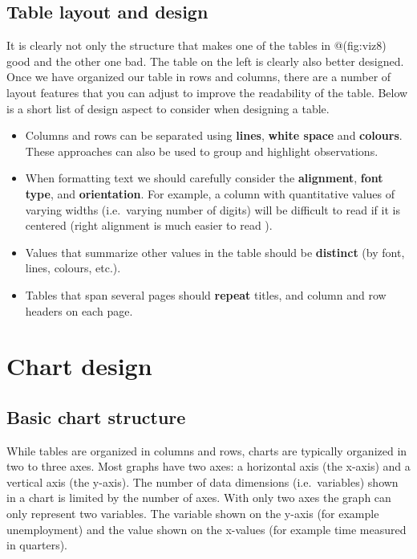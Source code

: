 \documentclass[
]{book}
\begin{document}
\hypertarget{table-layout-and-design}{%
\subsection*{Table layout and design}\label{table-layout-and-design}}

It is clearly not only the structure that makes one of the tables in @(fig:viz8) good and the other one bad. The table on the left is clearly also better designed. Once we have organized our table in rows and columns, there are a number of layout features that you can adjust to improve the readability of the table. Below is a short list of design aspect to consider when designing a table.

\begin{itemize}
\item
  Columns and rows can be separated using \textbf{lines}, \textbf{white space} and \textbf{colours}. These approaches can also be used to group and highlight observations.
\item
  When formatting text we should carefully consider the \textbf{alignment}, \textbf{font type}, and \textbf{orientation}. For example, a column with quantitative values of varying widths (i.e.~varying number of digits) will be difficult to read if it is centered (right alignment is much easier to read ).
\item
  Values that summarize other values in the table should be \textbf{distinct} (by font, lines, colours, etc.).
\item
  Tables that span several pages should \textbf{repeat} titles, and column and row headers on each page.
\end{itemize}

\hypertarget{chart-design}{%
\section{Chart design}\label{chart-design}}

\hypertarget{basic-chart-structure}{%
\subsection*{Basic chart structure}\label{basic-chart-structure}}

While tables are organized in columns and rows, charts are typically organized in two to three axes. Most graphs have two axes: a horizontal axis (the x-axis) and a vertical axis (the y-axis). The number of data dimensions (i.e.~variables) shown in a chart is limited by the number of axes. With only two axes the graph can only represent two variables. The variable shown on the y-axis (for example unemployment) and the value shown on the x-values (for example time measured in quarters).
\end{document}
